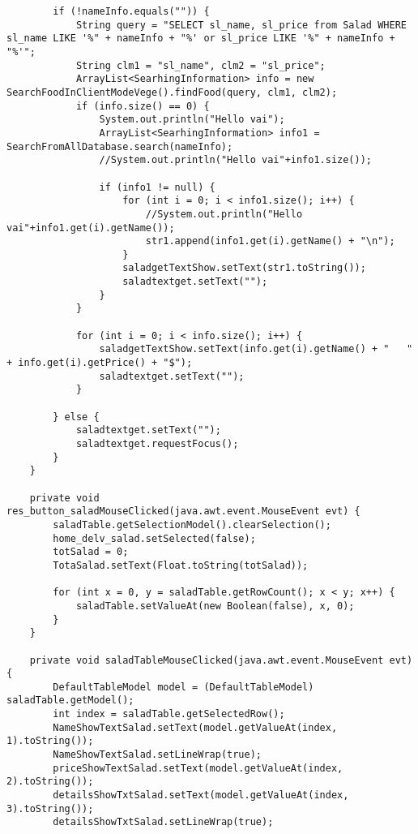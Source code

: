 \documentclass[12pt,a4paper]{article}
\begin{document}
\begin{lstlisting}
        if (!nameInfo.equals("")) {
            String query = "SELECT sl_name, sl_price from Salad WHERE sl_name LIKE '%" + nameInfo + "%' or sl_price LIKE '%" + nameInfo + "%'";
            String clm1 = "sl_name", clm2 = "sl_price";
            ArrayList<SearhingInformation> info = new SearchFoodInClientModeVege().findFood(query, clm1, clm2);
            if (info.size() == 0) {
                System.out.println("Hello vai");
                ArrayList<SearhingInformation> info1 = SearchFromAllDatabase.search(nameInfo);
                //System.out.println("Hello vai"+info1.size());

                if (info1 != null) {
                    for (int i = 0; i < info1.size(); i++) {
                        //System.out.println("Hello vai"+info1.get(i).getName());
                        str1.append(info1.get(i).getName() + "\n");
                    }
                    saladgetTextShow.setText(str1.toString());
                    saladtextget.setText("");
                }
            }

            for (int i = 0; i < info.size(); i++) {
                saladgetTextShow.setText(info.get(i).getName() + "   " + info.get(i).getPrice() + "$");
                saladtextget.setText("");
            }

        } else {
            saladtextget.setText("");
            saladtextget.requestFocus();
        }
    }                                                      

    private void res_button_saladMouseClicked(java.awt.event.MouseEvent evt) {                                              
        saladTable.getSelectionModel().clearSelection();
        home_delv_salad.setSelected(false);
        totSalad = 0;
        TotaSalad.setText(Float.toString(totSalad));

        for (int x = 0, y = saladTable.getRowCount(); x < y; x++) {
            saladTable.setValueAt(new Boolean(false), x, 0);
        }
    }                                             

    private void saladTableMouseClicked(java.awt.event.MouseEvent evt) {                                        
        DefaultTableModel model = (DefaultTableModel) saladTable.getModel();
        int index = saladTable.getSelectedRow();
        NameShowTextSalad.setText(model.getValueAt(index, 1).toString());
        NameShowTextSalad.setLineWrap(true);
        priceShowTextSalad.setText(model.getValueAt(index, 2).toString());
        detailsShowTxtSalad.setText(model.getValueAt(index, 3).toString());
        detailsShowTxtSalad.setLineWrap(true);


\end{lstlisting}
\end{document}
